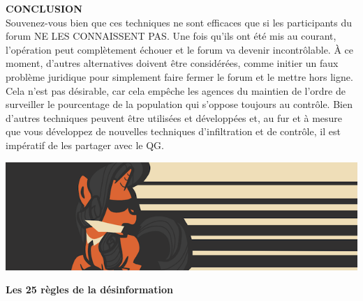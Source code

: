 \documentclass[11pt,twoside,a4paper]{article}
\begin{document}
\textbf{\large CONCLUSION}~\\

Souvenez-vous bien que ces techniques ne sont efficaces que si les participants du forum NE LES CONNAISSENT PAS. Une fois qu'ils ont {\'e}t{\'e} mis au courant, l'op{\'e}ration peut compl{\`e}tement {\'e}chouer et le forum va devenir incontr{\^o}lable. {\`A} ce moment, d'autres alternatives doivent {\^e}tre consid{\'e}r{\'e}es, comme initier un faux probl{\`e}me juridique pour simplement faire fermer le forum et le mettre hors ligne. Cela n'est pas d{\'e}sirable, car cela emp{\^e}che les agences du maintien de l'ordre de surveiller le pourcentage de la population qui s'oppose toujours au contr{\^o}le. Bien d'autres techniques peuvent {\^e}tre utilis{\'e}es et d{\'e}velopp{\'e}es et, au fur et {\`a} mesure que vous d{\'e}veloppez de nouvelles techniques d'infiltration et de contr{\^o}le, il est imp{\'e}ratif de les partager avec le QG.~\\

\vfill
\clearpage

\includegraphics[width=\textwidth]{img/wallpaper-1329118.png}

\textbf{\Large Les 25 r{\`e}gles de la d{\'e}sinformation}~\\
\end{document}
